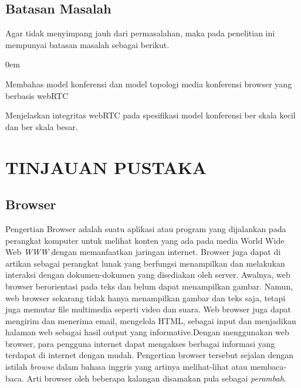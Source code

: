 \documentclass{jtetiproposalskripsi}
\begin{document}
\section{Batasan Masalah}
Agar tidak menyimpang jauh dari permasalahan, maka pada penelitian ini mempunyai batasan masalah sebagai berikut.
\vspace{-0.5cm}
\begin{enumerate}[1.]
\begin{singlespace}
\itemsep0em
\item Membahas model konferensi dan model topologi media konferensi browser yang berbasis webRTC
\item Menjelaskan integritas webRTC pada spesifikasi model konferensi ber skala kecil dan ber skala besar.
\end{singlespace}
\end{enumerate}


\chapter{TINJAUAN PUSTAKA}                

\section{Browser}
Pengertian Browser adalah suatu aplikasi atau program yang dijalankan pada perangkat komputer untuk melihat konten yang ada pada media World Wide Web \emph{WWW} dengan memanfaatkan jaringan internet. Browser juga dapat di artikan sebagai perangkat lunak yang berfungsi menampilkan dan melakukan interaksi dengan dokumen-dokumen yang disediakan oleh server. Awalnya, web browser berorientasi pada teks dan belum dapat menampilkan gambar. Namun, web browser sekarang tidak hanya menampilkan gambar dan teks saja, tetapi juga memutar file multimedia seperti video dan suara. Web browser juga dapat mengirim dan menerima email, mengelola HTML, sebagai input dan menjadikan halaman web sebagai hasil output yang informative.Dengan menggunakan web browser, para pengguna internet dapat mengakses berbagai informasi yang terdapat di internet dengan mudah. Pengertian browser tersebut sejalan dengan istilah \emph{browse} dalam bahasa inggris yang artinya melihat-lihat atau membaca-baca. Arti browser oleh beberapa kalangan disamakan pula sebagai \emph{perambah}.
\end{document}
